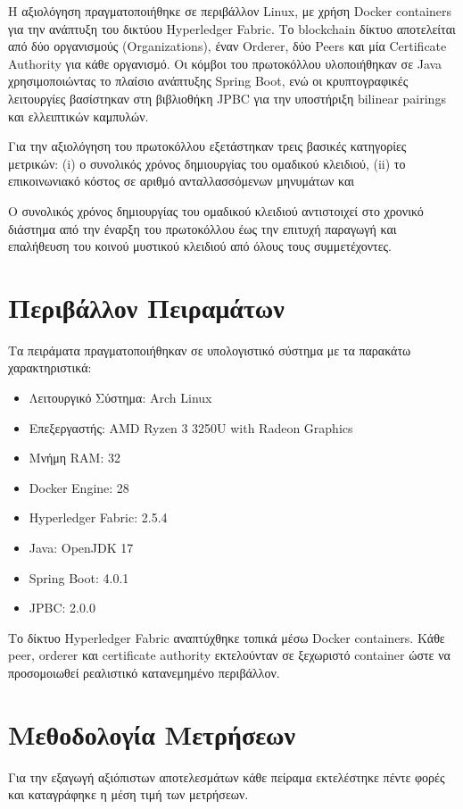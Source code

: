 \documentclass[12pt,a4paper]{report}
\begin{document}
Η αξιολόγηση πραγματοποιήθηκε σε περιβάλλον Linux, με χρήση Docker containers για την ανάπτυξη του δικτύου Hyperledger Fabric.
Το blockchain δίκτυο αποτελείται από δύο οργανισμούς (Organizations), έναν Orderer, δύο Peers και μία Certificate Authority για κάθε οργανισμό.
Οι κόμβοι του πρωτοκόλλου υλοποιήθηκαν σε Java χρησιμοποιώντας το πλαίσιο ανάπτυξης Spring Boot, ενώ οι κρυπτογραφικές λειτουργίες βασίστηκαν στη βιβλιοθήκη JPBC για την υποστήριξη bilinear pairings και ελλειπτικών καμπυλών.

Για την αξιολόγηση του πρωτοκόλλου εξετάστηκαν τρεις βασικές κατηγορίες μετρικών:
(i) ο συνολικός χρόνος δημιουργίας του ομαδικού κλειδιού,
(ii) το επικοινωνιακό κόστος σε αριθμό ανταλλασσόμενων μηνυμάτων και

Ο συνολικός χρόνος δημιουργίας του ομαδικού κλειδιού αντιστοιχεί στο χρονικό διάστημα από την έναρξη του πρωτοκόλλου έως την επιτυχή παραγωγή και επαλήθευση του κοινού μυστικού κλειδιού από όλους τους συμμετέχοντες.

\section{Περιβάλλον Πειραμάτων}

Τα πειράματα πραγματοποιήθηκαν σε υπολογιστικό σύστημα με τα
παρακάτω χαρακτηριστικά:

\begin{itemize}
\item Λειτουργικό Σύστημα: Arch Linux
\item Επεξεργαστής: AMD Ryzen 3 3250U with Radeon Graphics
\item Μνήμη RAM: 32
\item Docker Engine: 28
\item Hyperledger Fabric: 2.5.4
\item Java: OpenJDK 17
\item Spring Boot: 4.0.1
\item JPBC: 2.0.0
\end{itemize}

Το δίκτυο Hyperledger Fabric αναπτύχθηκε τοπικά μέσω Docker
containers. Κάθε peer, orderer και certificate authority
εκτελούνταν σε ξεχωριστό container ώστε να προσομοιωθεί
ρεαλιστικό κατανεμημένο περιβάλλον.

\section{Μεθοδολογία Μετρήσεων}

Για την εξαγωγή αξιόπιστων αποτελεσμάτων κάθε πείραμα
εκτελέστηκε πέντε φορές και καταγράφηκε η μέση τιμή των
μετρήσεων.
\end{document}
